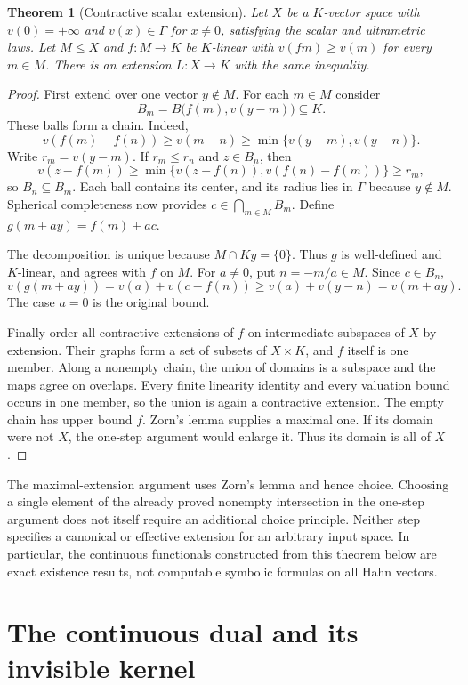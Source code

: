 \documentclass[11pt,letterpaper]{article}
\numberwithin{equation}{section}
\newtheorem{theorem}{Theorem}[section]
\theoremstyle{definition}
\theoremstyle{remark}
\begin{document}
\begin{theorem}[Contractive scalar extension]\label{duals:thm:HB}
Let $X$ be a $K$-vector space with $v(0)=+\infty$ and
$v(x)\in\Gamma$ for $x\ne0$, satisfying the scalar and ultrametric laws. Let $M\le X$ and
$f:M\to K$ be $K$-linear with $v(fm)\ge v(m)$ for every $m\in M$.
There is an extension $L:X\to K$ with the same inequality.
\end{theorem}
\begin{proof}
First extend over one vector $y\notin M$. For each $m\in M$ consider
\[
 B_m=B\bigl(f(m),v(y-m)\bigr)\subseteq K.
\]
These balls form a chain. Indeed,
\[
 v(f(m)-f(n))\ge v(m-n)
 \ge\min\{v(y-m),v(y-n)\}.
\]
Write $r_m=v(y-m)$. If $r_m\le r_n$ and $z\in B_n$, then
\[
 v(z-f(m))\ge\min\{v(z-f(n)),v(f(n)-f(m))\}\ge r_m,
\]
so $B_n\subseteq B_m$. Each ball contains its center, and its radius
lies in $\Gamma$ because $y\notin M$. Spherical completeness now
provides $c\in\bigcap_{m\in M}B_m$. Define
$g(m+ay)=f(m)+ac$.

The decomposition is unique because $M\cap Ky=\{0\}$.
Thus $g$ is well-defined and $K$-linear, and agrees with $f$ on $M$.
For $a\ne0$, put $n=-m/a\in M$.
Since $c\in B_n$,
\[
 v(g(m+ay))=v(a)+v(c-f(n))
 \ge v(a)+v(y-n)=v(m+ay).
\]
The case $a=0$ is the original bound.

Finally order all contractive extensions of $f$ on intermediate
subspaces of $X$ by extension. Their graphs form a set of subsets of
$X\times K$, and $f$ itself is one member. Along a nonempty chain, the union of
domains is a subspace and the maps agree on overlaps. Every finite
linearity identity and every valuation bound occurs in one member, so
the union is again a contractive extension. The empty chain has upper
bound $f$. Zorn's lemma supplies a maximal one. If its domain were not $X$, the one-step
argument would enlarge it. Thus its domain is all of $X$.
\end{proof}

The maximal-extension argument uses Zorn's lemma and hence choice.
Choosing a single element of the already proved nonempty intersection
in the one-step argument does not itself require an additional choice
principle. Neither step specifies a canonical or effective extension for
an arbitrary input space. In particular, the
continuous functionals constructed from this theorem below are exact
existence results, not computable symbolic formulas on all Hahn vectors.

\section{The continuous dual and its invisible kernel}
\label{duals:sec:continuous}
\end{document}
